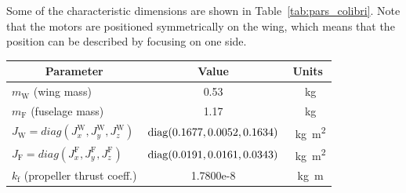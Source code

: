 Some of the characteristic dimensions are shown in Table~\ref{tab:pars_colibri}. Note that the motors are positioned symmetrically on the wing, which means that the position can be described by focusing on one side. 
\begin{table}[ht]
  \centering
    \begin{tabular}{|l|c|c|}
      \hline
      \multicolumn{1}{|c|}{Parameter} & Value & Units  \\
      \hline
      $m_{\text{W}}$ (wing mass)  & 0.53& \SI{}{\kilogram} \\
      \hline
      $m_{\text{F}}$ (fuselage mass)  & 1.17& \SI{}{\kilogram} \\
      \hline
      $J_{\text{W}}=diag(J_{x}^{\text{W}}, J_{y}^{\text{W}}, J_{z}^{\text{W}})$ & \!\! $\operatorname{diag}(0.1677,0.0052,0.1634)$\!\! & \SI{}{\kilogram\square\meter}\\
      \hline
      $J_{\text{F}}=diag(J_{x}^{\text{F}}, J_{y}^{\text{F}}, J_{z}^{\text{F}})$ & \!\! $\operatorname{diag}(0.0191,0.0161,0.0343)$\!\! & \SI{}{\kilogram\square\meter}\\
      \hline
      $k_{\text{f}}$ (propeller thrust coeff.) & 1.7800e-8 & \SI{}{\kilogram\meter}\\
      \hline

\end{tabular}
\end{table}
